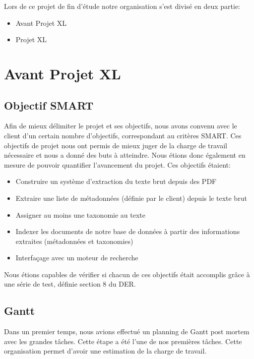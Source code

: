 Lors de ce projet de fin d’étude notre organisation s’est divisé en deux partie: 
\begin{itemize}
    \item Avant Projet XL 
    \item Projet XL 
\end{itemize}

\section{Avant Projet XL}

\subsection{Objectif SMART}
Afin de mieux délimiter le projet et ses objectifs, nous avons convenu avec le client d'un certain nombre d'objectifs, correspondant au critères SMART\@.
Ces objectifs de projet nous ont permis de mieux juger de la charge de travail nécessaire et nous a donné des buts à atteindre.
Nous étions donc également en mesure de pouvoir quantifier l'avancement du projet. Ces objectifs étaient: 

\begin{itemize}
    \item Construire un système d'extraction du texte brut depuis des PDF  
    \item Extraire une liste de métadonnées (définie par le client) depuis le texte brut
    \item Assigner au moins une taxonomie au texte 
    \item Indexer les documents de notre base de données à partir des informations extraites (métadonnées et taxonomies)
    \item Interfaçage avec un moteur de recherche  
\end{itemize}

Nous étions capables de vérifier si chacun de ces objectifs était accomplis grâce à une série de test, définie section 8 du DER\@. 



\subsection{Gantt}
Dans un premier temps, nous avions effectué un planning de Gantt post mortem avec les grandes tâches.
Cette étape a été l'une de nos premières tâches.
Cette organisation permet d’avoir une estimation de la charge de travail. 


